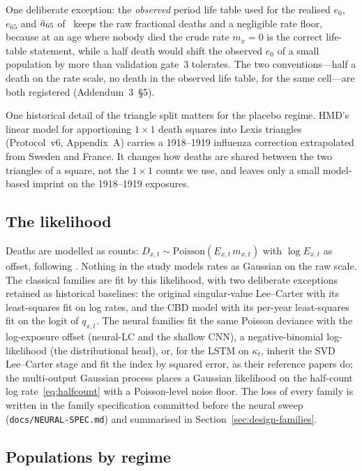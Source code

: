 One deliberate exception: the \emph{observed} period life table used for
the realised $e_0$, $e_{65}$ and $\ddot{a}_{65}$ of \Hfive\ keeps the raw
fractional deaths and a negligible rate floor, because at an age where
nobody died the crude rate $m_x=0$ is the correct life-table statement,
while a half death would shift the observed $e_0$ of a small population by
more than validation gate~3 tolerates. The two conventions---half a death
on the rate scale, no death in the observed life table, for the same
cell---are both registered (Addendum~3~\S5).

One historical detail of the triangle split matters for the placebo regime.
HMD's linear model for apportioning $1\times1$ death squares into Lexis
triangles (Protocol~v6, Appendix~A) carries a 1918--1919 influenza correction
extrapolated from Sweden and France. It changes how deaths are shared between
the two triangles of a square, not the $1\times1$ counts we use, and leaves
only a small model-based imprint on the 1918--1919 exposures.

\subsection{The likelihood}

Deaths are modelled as counts: $D_{x,t}\sim\mathrm{Poisson}(E_{x,t}\,m_{x,t})$
with $\log E_{x,t}$ as offset, following \citet{brouhns2002poisson}.
Nothing in the study models rates as Gaussian on the raw scale. The
classical families are fit by this likelihood, with two deliberate
exceptions retained as historical baselines: the original singular-value
Lee--Carter with its least-squares fit on log rates, and the CBD model with
its per-year least-squares fit on the logit of $q_{x,t}$. The neural
families fit the same Poisson deviance with the log-exposure offset
(neural-LC and the shallow CNN), a negative-binomial log-likelihood
(the distributional head), or, for the LSTM on $\kappa_t$, inherit the
SVD Lee--Carter stage and fit the index by squared error, as their
reference papers do; the multi-output Gaussian process places a Gaussian
likelihood on the half-count log rate~\eqref{eq:halfcount} with a
Poisson-level noise floor. The loss of every family is written in the
family specification committed before the neural sweep
(\texttt{docs/NEURAL-SPEC.md}) and summarised in
Section~\ref{sec:design-families}.

\subsection{Populations by regime}

